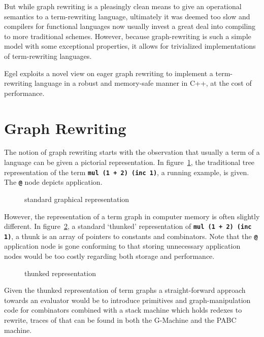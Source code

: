 \documentclass{research4cacm}
\newcommand{\code}[1]{{\bf\texttt{#1}}}
\begin{document}
But while graph rewriting is a pleasingly clean means to give an
operational semantics to a term-rewriting language, ultimately it
was deemed too slow and compilers for functional languages now
usually invest a great deal into compiling to more traditional
schemes.
However, because graph-rewriting is such a simple model with
some exceptional properties, it allows for trivialized implementations
of term-rewriting languages.

Egel exploits a novel view on eager graph rewriting to implement
a term-rewriting language in a robust and memory-safe manner in
C++, at the cost of performance.

\section{Graph Rewriting}

The notion of graph rewriting starts with the observation that usually
a term of a language can be given a pictorial representation.
In figure~\ref{figure:termA}, the traditional tree representation of
the term \code{mul (1 + 2) (inc 1)}, a running example, is given. 
The \code{@} node depicts application.

\begin{figure}[h]
\begin{center}
\caption{standard graphical representation}
\label{figure:termA}
\end{center}
\end{figure}

However, the representation of a term graph in computer memory is often
slightly different. In figure~\ref{figure:termB}, a standard `thunked'
representation of \code{mul (1 + 2) (inc 1)}, a thunk is an array
of pointers to constants and combinators.
Note that the \code{@} application node is gone conforming to
that storing unnecessary application nodes would be too 
costly regarding both storage and performance.

\begin{figure}[h]
\begin{center}
\caption{thunked representation}
\label{figure:termB}
\end{center}
\end{figure}

Given the thunked representation of term graphs a straight-forward
approach towards an evaluator would be to introduce primitives
and graph-manipulation code for combinators combined with a stack machine 
which holds redexes to rewrite, traces of that can be found in 
both the G-Machine and the PABC machine.
\end{document}
